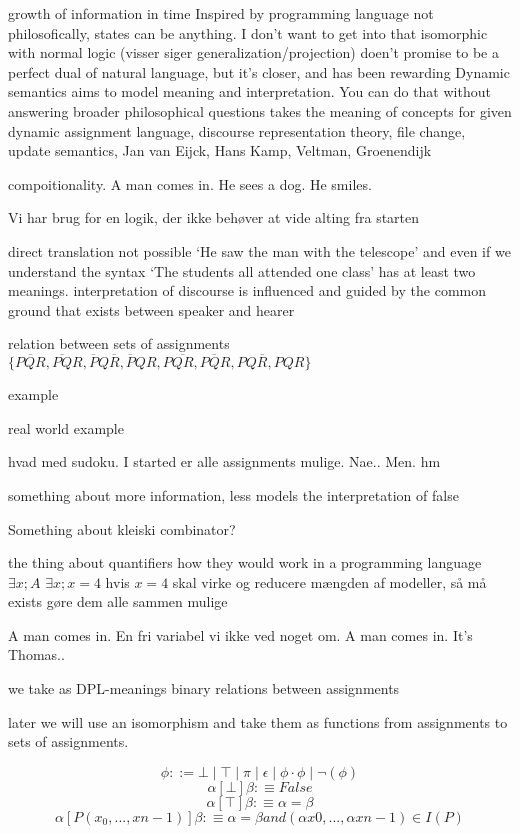 \documentclass[12pt]{article}
\begin{document}
growth of information in time
Inspired by programming language
not philosofically, states can be anything. I don't want to get into that
isomorphic with normal logic (visser siger generalization/projection)
doen't promise to be a perfect dual of natural language, but it's closer, and has been rewarding
Dynamic semantics aims to model meaning and interpretation. You can do that without answering broader philosophical questions
takes the meaning of concepts for given
dynamic assignment language, discourse representation theory, file change, update semantics, 
Jan van Eijck, Hans Kamp, Veltman, Groenendijk

compoitionality. A man comes in. He sees a dog. He smiles.

Vi har brug for en logik, der ikke behøver at vide alting fra starten

direct translation not possible
`He saw the man with the telescope'
and even if we understand the syntax
`The students all attended one class'
has at least two meanings.
interpretation of discourse is influenced and guided by the common ground that exists between speaker and hearer

relation between sets of assignments
$\{\overline{PQR}, \overline{PQ}R, \overline{P}Q\overline{R}, \overline{P}QR, P\overline{QR}, P\overline{Q}R, PQ\overline{R}, PQR\}$

example

real world example

hvad med sudoku. I started er alle assignments mulige. Nae.. Men. hm

something about more information, less models
the interpretation of false

Something about kleiski combinator?

the thing about quantifiers
how they would work in a programming language
$\exists x; A$
$\exists x; x = 4$ hvis $x=4$ skal virke og reducere mængden af modeller, så må exists gøre dem alle sammen mulige

A man comes in. En fri variabel vi ikke ved noget om.
A man comes in. It's Thomas..

we take as DPL-meanings binary relations between assignments

later we will use an isomorphism and take them as functions from assignments to sets of assignments.

\begin{equation}
\phi ::= \bot \mid \top \mid \pi \mid \epsilon \mid \phi \cdot \phi \mid \lnot(\phi)
\end{equation}
\begin{equation}
\alpha [\bot] \beta :\equiv False
\end{equation}
\begin{equation}
\alpha [\top] \beta :\equiv \alpha = \beta
\end{equation}
\begin{equation}
\alpha[P(x_0, ..., xn-1)]\beta :\equiv \alpha = \beta and (\alpha x0, ..., \alpha x n-1 ) \in I(P)
\end{equation}
\end{document}
